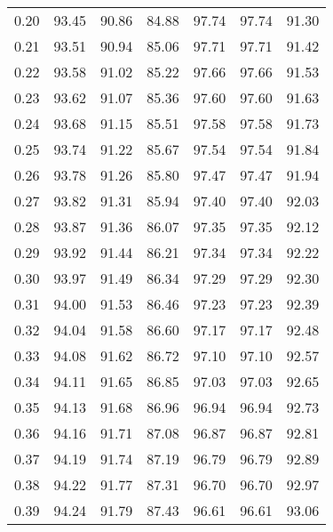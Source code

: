 \begin{tabular}{|c|c|c|c|c|c|c|}
      0.20 &     93.45 &     90.86 &      84.88 &   97.74 &      97.74 &         91.30 \\
      0.21 &     93.51 &     90.94 &      85.06 &   97.71 &      97.71 &         91.42 \\
      0.22 &     93.58 &     91.02 &      85.22 &   97.66 &      97.66 &         91.53 \\
      0.23 &     93.62 &     91.07 &      85.36 &   97.60 &      97.60 &         91.63 \\
      0.24 &     93.68 &     91.15 &      85.51 &   97.58 &      97.58 &         91.73 \\
      0.25 &     93.74 &     91.22 &      85.67 &   97.54 &      97.54 &         91.84 \\
      0.26 &     93.78 &     91.26 &      85.80 &   97.47 &      97.47 &         91.94 \\
      0.27 &     93.82 &     91.31 &      85.94 &   97.40 &      97.40 &         92.03 \\
      0.28 &     93.87 &     91.36 &      86.07 &   97.35 &      97.35 &         92.12 \\
      0.29 &     93.92 &     91.44 &      86.21 &   97.34 &      97.34 &         92.22 \\
      0.30 &     93.97 &     91.49 &      86.34 &   97.29 &      97.29 &         92.30 \\
      0.31 &     94.00 &     91.53 &      86.46 &   97.23 &      97.23 &         92.39 \\
      0.32 &     94.04 &     91.58 &      86.60 &   97.17 &      97.17 &         92.48 \\
      0.33 &     94.08 &     91.62 &      86.72 &   97.10 &      97.10 &         92.57 \\
      0.34 &     94.11 &     91.65 &      86.85 &   97.03 &      97.03 &         92.65 \\
      0.35 &     94.13 &     91.68 &      86.96 &   96.94 &      96.94 &         92.73 \\
      0.36 &     94.16 &     91.71 &      87.08 &   96.87 &      96.87 &         92.81 \\
      0.37 &     94.19 &     91.74 &      87.19 &   96.79 &      96.79 &         92.89 \\
      0.38 &     94.22 &     91.77 &      87.31 &   96.70 &      96.70 &         92.97 \\
      0.39 &     94.24 &     91.79 &      87.43 &   96.61 &      96.61 &         93.06 \\

\end{tabular}
